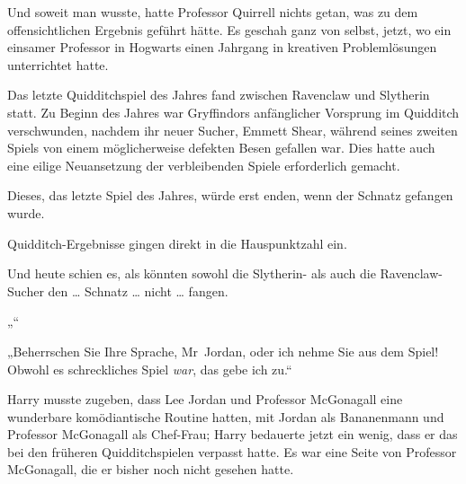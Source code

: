 Und soweit man wusste, hatte Professor Quirrell nichts getan, was zu dem offensichtlichen Ergebnis geführt hätte. Es geschah ganz von selbst, jetzt, wo ein einsamer Professor in Hogwarts einen Jahrgang in kreativen Problemlösungen unterrichtet hatte.

Das letzte Quidditchspiel des Jahres fand zwischen Ravenclaw und Slytherin statt. Zu Beginn des Jahres war Gryffindors anfänglicher Vorsprung im Quidditch verschwunden, nachdem ihr neuer Sucher, Emmett Shear, während seines zweiten Spiels von einem möglicherweise defekten Besen gefallen war. Dies hatte auch eine eilige Neuansetzung der verbleibenden Spiele erforderlich gemacht.

Dieses, das letzte Spiel des Jahres, würde erst enden, wenn der Schnatz gefangen wurde.

Quidditch-Ergebnisse gingen direkt in die Hauspunktzahl ein.

Und heute schien es, als könnten sowohl die Slytherin- als auch die Ravenclaw-Sucher den … Schnatz … nicht … fangen.

„“

„Beherrschen Sie Ihre Sprache, Mr~Jordan, oder ich nehme Sie aus dem Spiel! Obwohl es schreckliches Spiel \emph{war}, das gebe ich zu.“

Harry musste zugeben, dass Lee Jordan und Professor McGonagall eine wunderbare komödiantische Routine hatten, mit Jordan als Bananenmann und Professor McGonagall als Chef-Frau; Harry bedauerte jetzt ein wenig, dass er das bei den früheren Quidditchspielen verpasst hatte. Es war eine Seite von Professor McGonagall, die er bisher noch nicht gesehen hatte.

